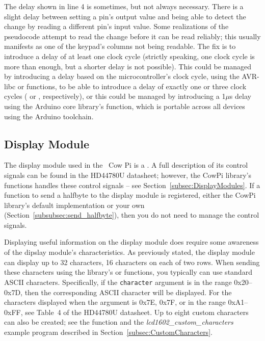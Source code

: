 The delay shown in line 4 is sometimes, but not always necessary.
There is a slight delay between setting a pin's output value and being able to detect the change by reading a different pin's input value.
Some realizations of the pseudocode attempt to read the change before it can be read reliably;
this usually manifests as one of the keypad's columns not being readable.
The fix is to introduce a delay of at least one clock cycle (strictly speaking, one clock cycle is more than enough, but a shorter delay is not possible).
This could be managed by introducing a delay based on the microcontroller's clock cycle, using the AVR-libc  or  functions,\cite{avrNOP}\cite{avrDelayBasic} to be able to introduce a delay of exactly one or three clock cycles ( or , respectively),
or this could be managed by introducing a 1$\mu$s delay using the Arduino core library's  function,\cite{arduinoDelay} which is portable across all devices using the Arduino toolchain.

\subsection{Display Module}

The display module used in the \hardwareversion~Cow Pi is a \displaymoduledescription.
A full description of its control signals can be found in the HD44780U datasheet;\cite{lcd1602}
however, the CowPi library's functions handles these control signals -- see Section~\ref{subsec:DisplayModules}.
If a function to send a halfbyte to the display module is registered, either the CowPi library's default implementation or your own (Section~\ref{subsubsec:send_halfbyte}), then you do not need to manage the control signals.

Displaying useful information on the display module does require some awareness of the dipslay module's characteristics.
As previously stated, the display module can display up to 32 characters, 16 characters on each of two rows.
When sending these characters using the library's \hyperlink{function:cowpi_lcd1602_place_character}{} or \hyperlink{function:cowpi_lcd1602_send_character}{} functions, you typically can use standard ASCII characters.
Specifically, if the \lstinline{character} argument is in the range 0x20--0x7D, then the corresponding ASCII character will be displayed.
For the characters displayed when the argument is 0x7E, 0x7F, or in the range 0xA1--0xFF, see Table~4 of the HD44780U datasheet.\cite{lcd1602}
Up to eight custom characters can also be created; see the \hyperlink{function:cowpi_lcd1602_create_character}{} function and the \textit{lcd1602\_custom\_characters} example program described in Section~\ref{subsec:CustomCharacters}.


